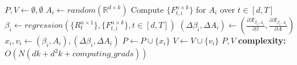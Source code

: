 \begin{algorithm}[H]
\caption{$\text{initialize\_position\_and\_velocity}(N)$}
\label{mopso:initilize_position_and_velocity}
\begin{algorithmic}[1]
\State $P, V \gets \emptyset, \emptyset$
    \State $A_i \gets random(\mathbb{R}^{d\times k})$
    \State Compute $\{F^{n\times k}_{t,i}\}$ for $A_i$ over $t\in [d,T]$
    \State $\beta_i \gets regression(\{R^{n\times 1}_{t}\},\{F^{n\times k}_{t,i}\}, t\in [d,T])$
    \State $(\Delta \beta_i,\Delta A_i) \gets (\frac{\partial \mathcal{R}_{\beta_i, A_{i}}}{\partial \beta},\frac{\partial \mathcal{R}_{\beta_i, A_{i}}}{\partial A})$
    \State $x_i, v_i\gets (\beta_i,A_i), (\Delta \beta_i,\Delta A_i)$
    \State $P\gets P \cup \{x_i\}$
    \State $V\gets V \cup \{v_i\}$
\EndFor
\State \Return $P, V$
\State \textbf{complexity: } $O(N(dk+d^2k+computing\_grads))$
\end{algorithmic}
\end{algorithm}

